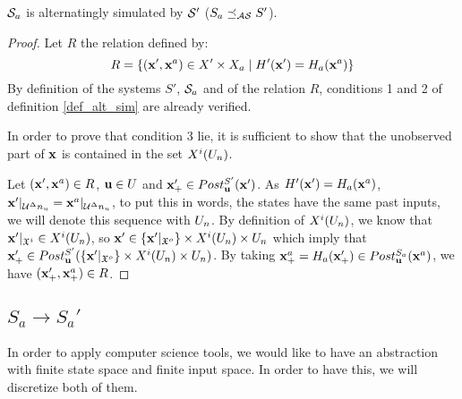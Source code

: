 \begin{prop}
$\mathcal{S}_a$ is alternatingly simulated by $\mathcal{S}'$ ($S_a \preceq_{\mathcal{AS}} S'$).
\end{prop}

\begin{proof}
Let $R$ the relation defined by:
\begin{equation}
R = \{ ( \mathbf{x}', \mathbf{x}^a) \in X' \times X_a \mid H'( \mathbf{x}') = H_a( \mathbf{x}^a) \}
\end{equation}
By definition of the systems $S'$, $\mathcal{S}_a$ and of the relation $R$, conditions 1 and 2 of definition \ref{def_alt_sim} are already verified.

In order to prove that condition 3 lie, it is sufficient to show that the unobserved part of $ \mathbf{x}$ is contained in the set $X^i(U_n)$.

Let $( \mathbf{x}', \mathbf{x}^a) \in R$, $ \mathbf{u} \in U$ and $ \mathbf{x}'_+ \in Post_{ \mathbf{u}}^{S'}( \mathbf{x}')$.
As $H'( \mathbf{x}') = H_a( \mathbf{x}^a)$, $ \mathbf{x}' |_{\mathcal{U}^\Delta n_u} =  \mathbf{x}^a |_{\mathcal{U}^\Delta n_u}$, to put this in words, the states have the same past inputs, we will denote this sequence with $U_n$.
By definition of $X^i(U_n)$,
we know that $ \mathbf{x}' |_{\mathfrak{X}^i} \in X^i(U_n)$,
so
$ \mathbf{x}' \in \{ \mathbf{x}' |_{\mathfrak{X}^o} \} \times X^i(U_n) \times U_n$
which imply that
$ \mathbf{x}'_+ \in Post_{ \mathbf{u}}^{S'}(\{ \mathbf{x}' |_{\mathfrak{X}^o} \} \times X^i(U_n) \times U_n )$.
By taking $ \mathbf{x}^a_+ = H_a( \mathbf{x}'_+) \in Post_{ \mathbf{u}}^{S_a}( \mathbf{x}^a)$,
we have $( \mathbf{x}'_+, \mathbf{x}^a_+) \in R$.
\end{proof}

\subsection{$S_a \rightarrow S_a'$}
In order to apply computer science tools, we would like to have an abstraction with finite state space and finite input space.
In order to have this, we will discretize both of them.

